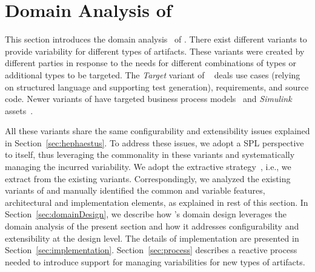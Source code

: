 
\section{Domain Analysis of \hpl}
\label{sec:domainAnalysis}

This section introduces the domain analysis~\cite{gpbook} of \hpl. There exist different \hp{} variants to provide variability for different types of artifacts. These variants were created by different parties in response to the needs for different combinations of types or additional types to be targeted. The \emph{Target} variant of \hp~\cite{ferreira:2010} deals use cases (relying on structured language and supporting test generation), requirements, and source code. Newer variants of \hp{} have targeted business process models~\cite{Machado:2011:MVB:1960502.1960508} and \emph{Simulink} assets~\cite{simulink}.

All these variants share the same configurability and extensibility issues explained in Section~\ref{sec:hephaestus}. To address these issues, we adopt a SPL perspective to \hp{} itself, thus leveraging the commonality in these variants and systematically managing the incurred variability. We adopt the extractive strategy~\cite{kruegerPFE01}, i.e., we extract \hpl{} from the existing \hp{} variants. Correspondingly, we analyzed the existing variants of \hp{} and manually identified the common and variable features, architectural and implementation elements, as explained in rest of this section. In Section~\ref{sec:domainDesign}, we describe how \hpl's domain design leverages the domain analysis of the present section and how it addresses configurability and extensibility at the design level. The details of implementation are presented in Section~\ref{sec:implementation}. Section~\ref{sec:process} describes a reactive process needed to introduce support for managing variabilities for new types of artifacts.


